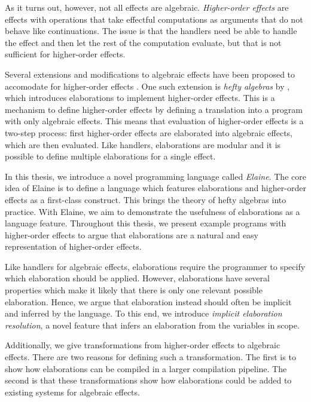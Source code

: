 
As it turns out, however, not all effects are algebraic. \emph{Higher-order effects} are effects with operations that take effectful computations as arguments that do not behave like continuations. The issue is that the handlers need be able to handle the effect and then let the rest of the computation evaluate, but that is not sufficient for higher-order effects.

Several extensions and modifications to algebraic effects have been proposed to accomodate for higher-order effects \autocite{wu_effect_2014,oh_latent_2021}. One such extension is \emph{hefty algebras} by \textcite{bach_poulsen_hefty_2023}, which introduces elaborations to implement higher-order effects. This is a mechanism to define higher-order effects by defining a translation into a program with only algebraic effects. This means that evaluation of higher-order effects is a two-step process: first higher-order effects are elaborated into algebraic effects, which are then evaluated. Like handlers, elaborations are modular and it is possible to define multiple elaborations for a single effect.

In this thesis, we introduce a novel programming language called \emph{Elaine}. The core idea of Elaine is to define a language which features elaborations and higher-order effects as a first-class construct. This brings the theory of hefty algebras into practice. With Elaine, we aim to demonstrate the usefulness of elaborations as a language feature. Throughout this thesis, we present example programs with higher-order effects to argue that elaborations are a natural and easy representation of higher-order effects.

Like handlers for algebraic effects, elaborations require the programmer to specify which elaboration should be applied. However, elaborations have several properties which make it likely that there is only one relevant possible elaboration. Hence, we argue that elaboration instead should often be implicit and inferred by the language. To this end, we introduce \emph{implicit elaboration resolution}, a novel feature that infers an elaboration from the variables in scope.

Additionally, we give transformations from higher-order effects to algebraic effects. There are two reasons for defining such a transformation. The first is to show how elaborations can be compiled in a larger compilation pipeline. The second is that these transformations show how elaborations could be added to existing systems for algebraic effects.

